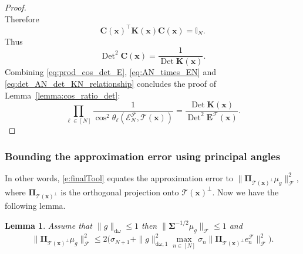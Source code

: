 \documentclass[twoside,11pt]{book}
\newtheorem{lemma}{Lemma}
\DeclareMathOperator{\Det}{Det}
\DeclareMathOperator{\Tran}{\intercal}
\newcommand{\rb}[1]{\textcolor{magenta}{#1}}
\begin{document}
\begin{proof}
\begin{equation}
\end{equation}
Therefore
\begin{equation}
\bm{C}(\bm{x})^{\Tran} \bm{K}(\bm{x}) \bm{C}(\bm{x}) = \mathbb{I}_{N}.
\end{equation}
Thus
\begin{equation}\label{eq:det_AN_det_KN_relationship}
\Det^{2} \bm{C}(\bm{x}) = \frac{1}{\Det \bm{K}(\bm{x})}.
\end{equation}
Combining \eqref{eq:prod_cos_det_E}, \eqref{eq:AN_times_EN} and \eqref{eq:det_AN_det_KN_relationship} concludes the proof of Lemma~\ref{lemma:cos_ratio_det}:
\begin{equation}
\prod\limits_{\ell \in [N]} \frac{1}{\cos^{2} \theta_{\ell} \left(\mathcal{E}^{\mathcal{F}}_{N}, \mathcal{T}(\bm{x}) \right)} = \frac{\Det \bm{K}(\bm{x})}{\Det^{2} \bm{E}^{\mathcal{F}}(\bm{x})}.
\end{equation}
\end{proof}



\subsubsection{Bounding the approximation error using principal angles}
\label{subsec:approximation_error_principal_angle}


In other words, \eqref{e:finalTool} equates the approximation error to $\|\bm{\Pi}_{\mathcal{T}(\bm{x})^{\perp}}\mu_g\|^{2}_{\mathcal{F}}$, where $\bm{\Pi}_{\mathcal{T}(\bm{x})^{\perp}}$ is the orthogonal projection onto $\mathcal{T}(\bm{x})^{\perp}$.
Now we have the following lemma.

\begin{lemma}\label{lemma:approximation_error_spectral_bound}
Assume that $\|g\|_{\mathrm{d}\omega} \leq 1$ then $\| \bm{\Sigma}^{-1/2} \mu_{g} \|_{\mathcal{F}} \leq 1$ and
\begin{equation}
	\|\bm{\Pi}_{\mathcal{T}(\bm{x})^{\perp}}\mu_{g}\|^{2}_{\mathcal{F}} \leq 2 \bigg( \sigma_{N+1} + \|g\|_{\mathrm{d}\omega,1}^2  \max\limits_{ n \in [N]} \sigma_{n}\|\bm{\Pi}_{\mathcal{T}(\bm{x})^{\perp}} e_{n}^{\mathcal{F}}\|_{\mathcal{F}}^{2} \bigg) .
\label{e:boundingOrthogonalProjection}
\end{equation}
\end{lemma}
\end{document}
